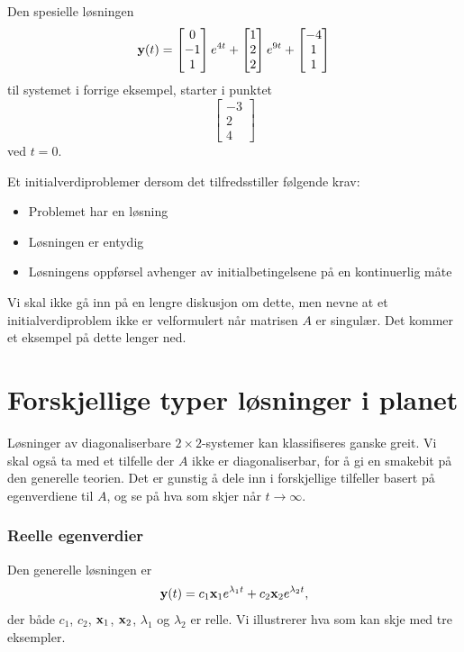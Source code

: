 \begin{ex}
Den spesielle løsningen 
\[
\mathbf{y}(t)=
\begin{bmatrix}
0 \\ -1 \\ 1
\end{bmatrix} e^{4t}
+
\begin{bmatrix}
1 \\ 2 \\ 2
\end{bmatrix}e^{9t}
+
\begin{bmatrix}
-4 \\ 1 \\ 1
\end{bmatrix}
\]
til systemet i forrige eksempel, starter i punktet 
\[
\begin{bmatrix}
-3 \\ 2 \\ 4
\end{bmatrix}
\]
ved $t=0$. \qedhere
\end{ex}

\begin{defnx}
Et initialverdiproblemer  dersom det tilfredsstiller følgende krav:
\begin{itemize}
\item Problemet har en løsning
\item Løsningen er entydig
\item Løsningens oppførsel avhenger av initialbetingelsene på en kontinuerlig måte
\end{itemize}
\end{defnx}

Vi skal ikke gå inn på en lengre diskusjon om dette, men nevne at et initialverdiproblem ikke er velformulert når matrisen $A$ er singulær. 
Det kommer et eksempel på dette lenger ned.

\section*{Forskjellige typer løsninger i planet}

Løsninger av diagonaliserbare $2 \times 2$-systemer kan klassifiseres ganske greit. 
Vi skal også ta med et tilfelle der $A$ ikke er diagonaliserbar, for å gi en smakebit på den generelle teorien. 
Det er gunstig å dele inn i forskjellige tilfeller basert på egenverdiene til $A$, og se på hva som skjer når $t \to \infty$.

\subsubsection*{Reelle egenverdier}
Den generelle løsningen er
\[
\mathbf{y}(t)=c_1\mathbf{x}_1e^{\lambda_1 t}+c_2\mathbf{x}_2e^{\lambda_2 t},
\]
der både $c_1$, $c_2$, $\mathbf{x}_1$, $\mathbf{x}_2$, $\lambda_1$ og $\lambda_2$ er relle. Vi illustrerer hva som kan skje med tre eksempler.


